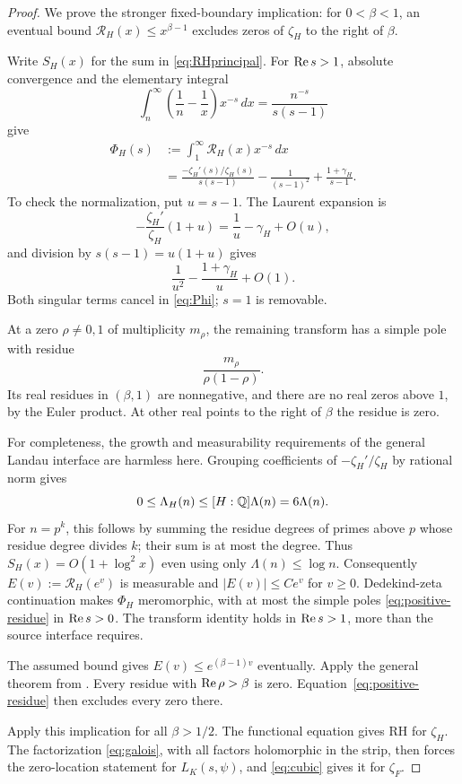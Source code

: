 \begin{proof}
We prove the stronger fixed-boundary implication: for \(0<\beta<1\), an eventual bound \(\mathcal R_H(x)\le x^{\beta-1}\) excludes zeros of \(\zeta_H\) to the right of \(\beta\).

Write \(S_H(x)\) for the sum in \eqref{eq:RHprincipal}. For \(\operatorname{Re} s>1\), absolute convergence and the elementary integral
\[
\int_n^\infty\left(\frac1n-\frac1x\right)x^{-s}\,dx
=\frac{n^{-s}}{s(s-1)}
\]
give
\begin{align}\label{eq:Phi}
\Phi_H(s)
&:=\int_1^\infty\mathcal R_H(x)x^{-s}\,dx\\
&=
\frac{-\zeta_H'(s)/\zeta_H(s)}{s(s-1)}
-\frac1{(s-1)^2}
+\frac{1+\gamma_H}{s-1}.\nonumber
\end{align}
To check the normalization, put \(u=s-1\). The Laurent expansion is
\[
-\frac{\zeta_H'}{\zeta_H}(1+u)
=\frac1u-\gamma_H+O(u),
\]
and division by \(s(s-1)=u(1+u)\) gives
\[
\frac1{u^2}-\frac{1+\gamma_H}{u}+O(1).
\]
Both singular terms cancel in \eqref{eq:Phi}; \(s=1\) is removable.

At a zero \(\rho\ne0,1\) of multiplicity \(m_\rho\), the remaining transform has a simple pole with residue
\begin{equation}\label{eq:positive-residue}
\frac{m_\rho}{\rho(1-\rho)}.
\end{equation}
Its real residues in \((\beta,1)\) are nonnegative, and there are no real zeros above \(1\), by the Euler product. At other real points to the right of \(\beta\) the residue is zero.

For completeness, the growth and measurability requirements of the general Landau interface are harmless here. Grouping coefficients of \(-\zeta_H'/\zeta_H\) by rational norm gives
\[
0\le\Lambda_H(n)\le[H:\mathbb{Q}]\Lambda(n)=6\Lambda(n).
\]
For \(n=p^k\), this follows by summing the residue degrees of primes above \(p\) whose residue degree divides \(k\); their sum is at most the degree. Thus \(S_H(x)=O(1+\log^2x)\) even using only \(\Lambda(n)\le\log n\). Consequently \(E(v):=\mathcal R_H(e^v)\) is measurable and \(|E(v)|\le Ce^v\) for \(v\ge0\). Dedekind-zeta continuation makes \(\Phi_H\) meromorphic, with at most the simple poles \eqref{eq:positive-residue} in \(\operatorname{Re} s>0\). The transform identity holds in \(\operatorname{Re} s>1\), more than the source interface requires.

The assumed bound gives \(E(v)\le e^{(\beta-1)v}\) eventually. Apply the general  theorem from . Every residue with \(\operatorname{Re}\rho>\beta\) is zero. Equation~\eqref{eq:positive-residue} then excludes every zero there.

Apply this implication for all \(\beta>1/2\). The functional equation gives RH for \(\zeta_H\). The factorization \eqref{eq:galois}, with all factors holomorphic in the strip, then forces the zero-location statement for \(L_K(s,\psi)\), and \eqref{eq:cubic} gives it for \(\zeta_F\).
\end{proof}

